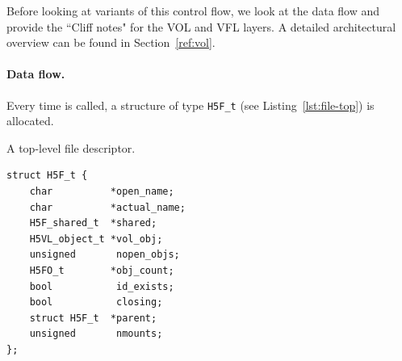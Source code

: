Before looking at variants of this control flow, we look at the data flow and provide the ``Cliff notes" for the VOL and VFL layers. A detailed architectural overview can be found in Section~\ref{ref:vol}.

\paragraph{Data flow.} Every time  is called, a structure of type \texttt{H5F\_t} (see Listing~\ref{lst:file-top}) is allocated.

\begin{listing}
\centering
\caption{A top-level file descriptor.}
\label{lst:file-top}
\begin{verbatim}
struct H5F_t {
    char          *open_name;
    char          *actual_name;
    H5F_shared_t  *shared;
    H5VL_object_t *vol_obj;
    unsigned       nopen_objs;
    H5FO_t        *obj_count;
    bool           id_exists;
    bool           closing;
    struct H5F_t  *parent;
    unsigned       nmounts;
};
\end{verbatim}
\end{listing}

